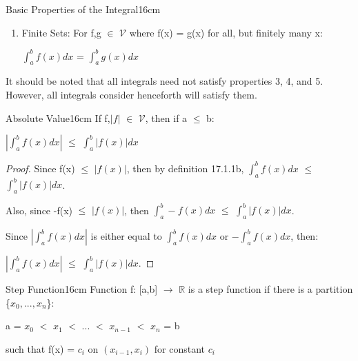 \begin{definition}{Basic Properties of the Integral}{16cm}
\begin{enumerate}[label=(\alph*), leftmargin=1cm, itemsep=0.1cm]
                \hspace{0.5cm}
                $\int_a^b C dx$ = $C(b-a)$

            \item {\color{lgreen} Finite Sets}:
                For f,g $\in$ $\mathcal{V}$ where f(x) = g(x)
                for all, but finitely many x:
            
                \hspace{0.5cm}
                $\int_a^b f(x) dx$ = $\int_a^b g(x) dx$
        \end{enumerate}

        It should be noted that all integrals need not satisfy properties
        3, 4, and 5. However, all integrals consider henceforth will satisfy them.
    \end{definition}

    \vspace{0.5cm}



    \begin{wtheorem}{Absolute Value}{16cm}
        If f,$|f|$ $\in$ $\mathcal{V}$, then if a $\leq$ b:

        \hspace{0.5cm}
        $|\int_a^b f(x) dx|$
        $\leq$ $\int_a^b |f(x)| dx$
    \end{wtheorem}

    \begin{proof}
        Since f(x) $\leq$ $|f(x)|$, then by {\color{blue} definition 17.1.1b},
        $\int_a^b f(x) dx$ $\leq$ $\int_a^b |f(x)| dx$.

        Also, since -f(x) $\leq$ $|f(x)|$, then
        $\int_a^b -f(x) dx$ $\leq$ $\int_a^b |f(x)| dx$.
        
        Since $|\int_a^b f(x) dx|$ is either equal to
        $\int_a^b f(x) dx$ or $-\int_a^b f(x) dx$, then:
        
        \hspace{0.5cm}
        $|\int_a^b f(x) dx|$ $\leq$ $\int_a^b |f(x)| dx$.
    \end{proof}

    \vspace{0.5cm}



    \begin{definition}{Step Function}{16cm}
        Function f: [a,b] $\rightarrow$ $\mathbb{R}$
        is a {\color{lblue} step function} if there is
        a partition \{$x_0,...,x_n$\}:

        \hspace{0.5cm}
        a = $x_0$ $<$ $x_1$ $<$ ... $<$ $x_{n-1}$ $<$ $x_n$ = b

        such that f(x) = $c_i$ on $(x_{i-1},x_i)$ for constant $c_i$ 
    \end{definition}

